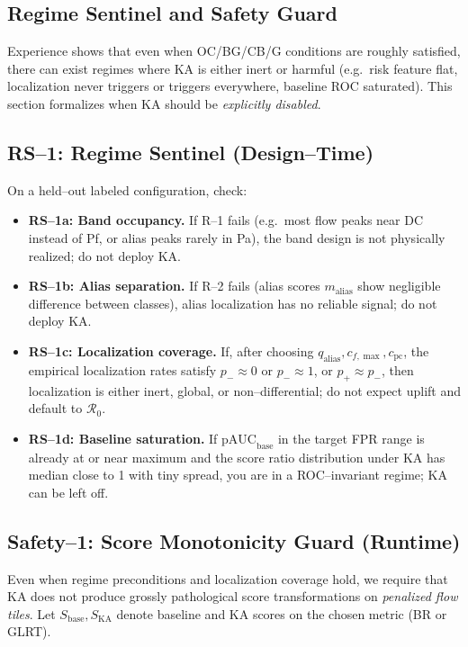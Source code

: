 \subsection{Regime Sentinel and Safety Guard}
\label{sec:regime-sentinel}

Experience shows that even when OC/BG/CB/G conditions are roughly satisfied, there can exist regimes where KA is either inert or harmful (e.g.\ risk feature flat, localization never triggers or triggers everywhere, baseline ROC saturated). This section formalizes when KA should be \emph{explicitly disabled}.

\subsection{RS--1: Regime Sentinel (Design--Time)}

On a held--out labeled configuration, check:

\begin{itemize}[nosep]
  \item \textbf{RS--1a: Band occupancy.} If R--1 fails (e.g.\ most flow peaks near DC instead of Pf, or alias peaks rarely in Pa), the band design is not physically realized; do not deploy KA.
  \item \textbf{RS--1b: Alias separation.} If R--2 fails (alias scores $m_{\text{alias}}$ show negligible difference between classes), alias localization has no reliable signal; do not deploy KA.
  \item \textbf{RS--1c: Localization coverage.} If, after choosing $q_{\text{alias}},c_{f,\max},c_{\text{pc}}$, the empirical localization rates satisfy $p_-\approx 0$ or $p_-\approx 1$, or $p_+ \approx p_-$, then localization is either inert, global, or non--differential; do not expect uplift and default to $\mathcal{R}_0$.
  \item \textbf{RS--1d: Baseline saturation.} If $\text{pAUC}_\text{base}$ in the target FPR range is already at or near maximum and the score ratio distribution under KA has median close to 1 with tiny spread, you are in a ROC--invariant regime; KA can be left off.
\end{itemize}

\subsection{Safety--1: Score Monotonicity Guard (Runtime)}

Even when regime preconditions and localization coverage hold, we require that KA does not produce grossly pathological score transformations on \emph{penalized flow tiles}. Let $S_{\text{base}},S_{\text{KA}}$ denote baseline and KA scores on the chosen metric (BR or GLRT).

